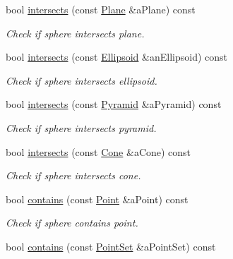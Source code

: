 \begin{DoxyCompactItemize}
bool \hyperlink{classostk_1_1math_1_1geom_1_1d3_1_1objects_1_1_sphere_a04479c6d128c10c2395884a82c5abcad}{intersects} (const \hyperlink{classostk_1_1math_1_1geom_1_1d3_1_1objects_1_1_plane}{Plane} \&a\+Plane) const
\begin{DoxyCompactList}\small\item\em Check if sphere intersects plane. \end{DoxyCompactList}\item 
bool \hyperlink{classostk_1_1math_1_1geom_1_1d3_1_1objects_1_1_sphere_acbde8aef7194e50be8be8fe5c5fa2e17}{intersects} (const \hyperlink{classostk_1_1math_1_1geom_1_1d3_1_1objects_1_1_ellipsoid}{Ellipsoid} \&an\+Ellipsoid) const
\begin{DoxyCompactList}\small\item\em Check if sphere intersects ellipsoid. \end{DoxyCompactList}\item 
bool \hyperlink{classostk_1_1math_1_1geom_1_1d3_1_1objects_1_1_sphere_af446f8d8e7dd3fe20a719fe07c2ec91c}{intersects} (const \hyperlink{classostk_1_1math_1_1geom_1_1d3_1_1objects_1_1_pyramid}{Pyramid} \&a\+Pyramid) const
\begin{DoxyCompactList}\small\item\em Check if sphere intersects pyramid. \end{DoxyCompactList}\item 
bool \hyperlink{classostk_1_1math_1_1geom_1_1d3_1_1objects_1_1_sphere_a376f9b54902cab434a6fda22fa40a64e}{intersects} (const \hyperlink{classostk_1_1math_1_1geom_1_1d3_1_1objects_1_1_cone}{Cone} \&a\+Cone) const
\begin{DoxyCompactList}\small\item\em Check if sphere intersects cone. \end{DoxyCompactList}\item 
bool \hyperlink{classostk_1_1math_1_1geom_1_1d3_1_1objects_1_1_sphere_a65299f7b2db42d3ad1b32fc70c9845ae}{contains} (const \hyperlink{classostk_1_1math_1_1geom_1_1d3_1_1objects_1_1_point}{Point} \&a\+Point) const
\begin{DoxyCompactList}\small\item\em Check if sphere contains point. \end{DoxyCompactList}\item 
bool \hyperlink{classostk_1_1math_1_1geom_1_1d3_1_1objects_1_1_sphere_a91a6e5273a96a5bc92da78ea786e2ab5}{contains} (const \hyperlink{classostk_1_1math_1_1geom_1_1d3_1_1objects_1_1_point_set}{Point\+Set} \&a\+Point\+Set) const

\end{DoxyCompactItemize}
